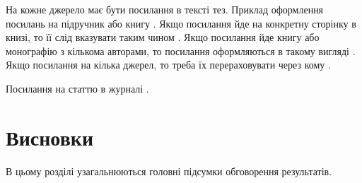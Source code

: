 \documentclass{ConfFTI}
\begin{document}
			
						
На кожне джерело має бути посилання в тексті тез.
Приклад оформлення посилань на підручник або книгу \cite{Vasylenko92}.
Якщо посилання йде на конкретну сторінку в книзі, то її слід вказувати таким чином \cite[стор. 4]{Vasylenko92}.
Якщо посилання йде книгу або монографію з кількома авторами, то посилання оформляються в такому вигляді
\cite{ObchTech93}. Якщо посилання на кілька джерел, то треба їх перераховувати через кому
\cite{Vasylenko92, ObchTech93}.
							
Посилання на статтю в журналі \cite{Ponomarenko86a, Malikov92}.
		
		
				
			
\section*{Висновки}
	
	
						
В цьому розділі узагальнюються головні підсумки обговорення результатів.
				
						
		


		
		
 																
 														


			
\end{document}
